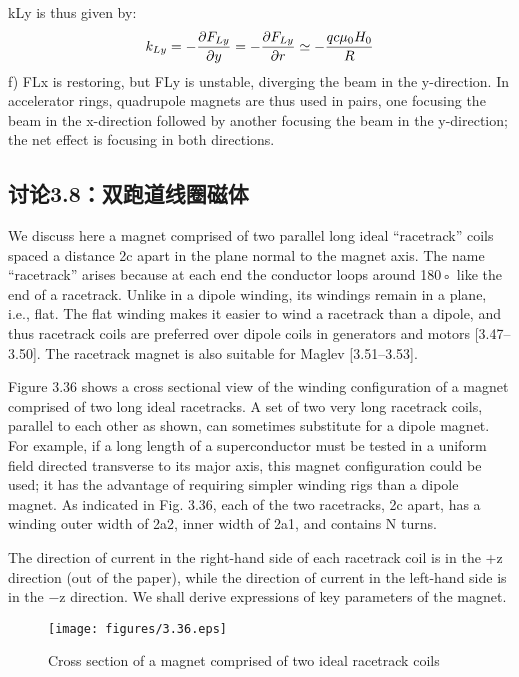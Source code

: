 kLy is thus given by:
$$
k_{Ly}=-\frac{\partial F_{Ly}}{\partial y}=-\frac{\partial F_{Ly}}{\partial r}\\
\simeq-\frac{qc \mu_{0}H_{0}}{R}\\%
$$
f) FLx is restoring, but FLy is unstable, diverging the beam in the y-direction.
In accelerator rings, quadrupole magnets are thus used in pairs, one focusing the
beam in the x-direction followed by another focusing the beam in the y-direction;
the net effect is focusing in both directions.
\newpage



\subsection{讨论3.8：双跑道线圈磁体}
We discuss here a magnet comprised of two parallel long ideal “racetrack” coils
spaced a distance 2c apart in the plane normal to the magnet axis. The name
“racetrack” arises because at each end the conductor loops around 180◦ like the
end of a racetrack. Unlike in a dipole winding, its windings remain in a plane, i.e.,
flat. The flat winding makes it easier to wind a racetrack than a dipole, and thus
racetrack coils are preferred over dipole coils in generators and motors [3.47–3.50].
The racetrack magnet is also suitable for Maglev [3.51–3.53].

Figure 3.36 shows a cross sectional view of the winding configuration of a magnet
comprised of two long ideal racetracks. A set of two very long racetrack coils,
parallel to each other as shown, can sometimes substitute for a dipole magnet.
For example, if a long length of a superconductor must be tested in a uniform field
directed transverse to its major axis, this magnet configuration could be used; it
has the advantage of requiring simpler winding rigs than a dipole magnet. As
indicated in Fig. 3.36, each of the two racetracks, 2c apart, has a winding outer
width of 2a2, inner width of 2a1, and contains N turns.

The direction of current in the right-hand side of each racetrack coil is in the +z
direction (out of the paper), while the direction of current in the left-hand side is
in the −z direction. We shall derive expressions of key parameters of the magnet.
\begin{figure}[htbp]
	\centering
	\texttt{[image: figures/3.36.eps]}
	\caption{Cross section of a magnet comprised of two ideal racetrack coils}
\end{figure}

